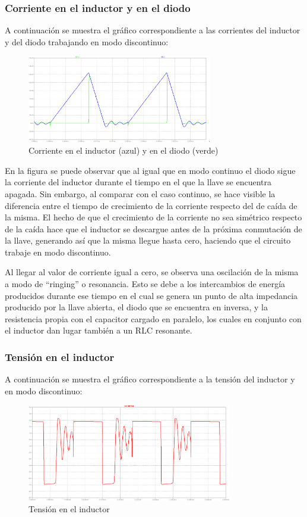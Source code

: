 \documentclass[e4_tp1_main.tex]{subfiles}
\begin{document}
	
	\subsubsection{Corriente en el inductor y en el diodo}
	A continuación se muestra el gráfico correspondiente a las corrientes del inductor y del diodo trabajando en modo discontinuo:
	
	\begin{figure}[H]
		\centering
		\includegraphics[width=0.72\textwidth]{images/ej4/fig3.png}
		\caption{Corriente en el inductor (azul) y en el diodo (verde)}
		\label{fig:my_label}
	\end{figure}
	
	En la figura se puede observar que al igual que en modo continuo el diodo sigue la corriente del inductor durante el tiempo en el que la llave se encuentra apagada. Sin embargo, al comparar con el caso continuo, se hace visible la diferencia entre el tiempo de crecimiento de la corriente respecto del de caída de la misma. El hecho de que el crecimiento de la corriente no sea simétrico respecto de la caída hace que el inductor se descargue antes de la próxima conmutación de la llave, generando así que la misma llegue hasta cero, haciendo que el circuito trabaje en modo discontinuo.
	
	Al llegar al valor de corriente igual a cero, se observa una oscilación de la misma a modo de ``ringing'' o resonancia. Esto se debe a los intercambios de energía producidos durante ese tiempo en el cual se genera un punto de alta impedancia producido por la llave abierta, el diodo que se encuentra en inversa, y la resistencia propia con el capacitor cargado en paralelo, los cuales en conjunto con el inductor dan lugar también a un RLC resonante.
	
	\subsubsection{Tensión en el inductor}
	A continuación se muestra el gráfico correspondiente a la tensión del inductor y en modo discontinuo:
	\begin{figure}[H]
		\centering
		\includegraphics[width=0.8\textwidth]{images/ej4/fig4.png}
		\caption{Tensión en el inductor}
		\label{fig:my_label}
	\end{figure}
		
\end{document}
